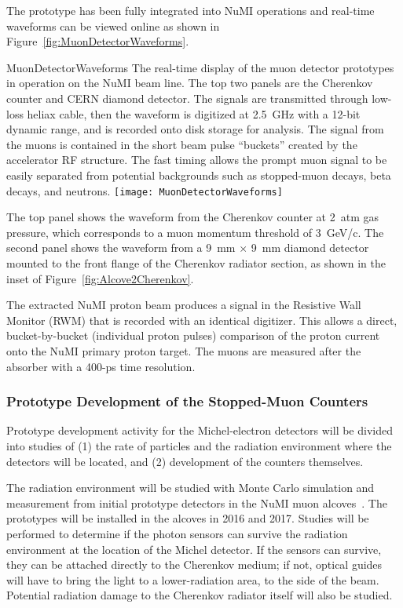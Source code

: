 The prototype has been fully integrated into NuMI operations and
real-time waveforms can be viewed online as shown in
Figure~\ref{fig:MuonDetectorWaveforms}.
\begin{cdrfigure}{MuonDetectorWaveforms}
{The real-time display of the muon detector prototypes in operation
on the NuMI beam line. The top two panels are the Cherenkov counter
and CERN diamond detector. The signals are
transmitted through low-loss heliax cable, then the waveform
is digitized at 2.5~GHz with a 12-bit dynamic range, and is
recorded onto disk storage for analysis. The signal from the
muons is contained in the short beam pulse ``buckets'' created
by the accelerator RF structure. The fast timing allows the
prompt muon signal to be easily separated from potential backgrounds
such as stopped-muon decays, beta decays, and neutrons.}
\texttt{[image: MuonDetectorWaveforms]}
\end{cdrfigure}
The top panel shows the waveform from the Cherenkov counter at 2~atm
gas pressure, which corresponds to a muon momentum threshold of
3~GeV/c. The second panel shows the waveform from a 9~mm $\times$ 9~mm
diamond detector mounted to the front flange of the Cherenkov radiator
section, as shown in the inset of Figure~\ref{fig:Alcove2Cherenkov}.

The extracted NuMI proton beam produces a signal in the Resistive Wall
Monitor (RWM) that is recorded with an identical digitizer. This allows a direct,
bucket-by-bucket (individual proton pulses) comparison of the proton
current onto the NuMI primary proton target. The muons are measured
after the absorber with a 400-ps time resolution.

\subsubsection{Prototype Development of the Stopped-Muon Counters}

Prototype development activity for the Michel-electron detectors will
be divided into studies of (1) the rate of particles and the radiation environment where
the detectors will be located, and (2) development of the counters
themselves.

The radiation environment will be studied with Monte Carlo
simulation and measurement from initial prototype detectors
in the NuMI muon alcoves~\cite{ref:NuMIBeamMonitors}.
The prototypes will be installed in the alcoves in 2016 and 2017.
Studies will be performed to determine if the photon sensors
can survive the radiation environment at the location of the Michel
detector. If the sensors can survive, they can be attached directly to
the Cherenkov medium; if not, optical guides will have to bring the
light to a lower-radiation area, to the side of the beam. Potential
radiation damage to the Cherenkov radiator itself will also be
studied.

